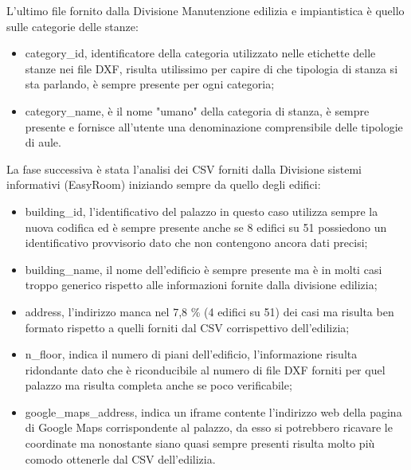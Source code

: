 \documentclass[12pt]{report}
\begin{document}
\vspace{5mm} %

L'ultimo file fornito dalla Divisione Manutenzione edilizia e impiantistica è quello sulle categorie delle stanze:
\begin{itemize}
\item category\_id, identificatore della categoria utilizzato nelle etichette delle stanze nei file DXF, risulta utilissimo per capire di che tipologia di stanza si sta parlando, è sempre presente per ogni categoria;
\item category\_name, è il nome "umano"  della categoria di stanza, è sempre presente e fornisce all'utente una denominazione comprensibile delle tipologie di aule.
\end{itemize} 

\vspace{5mm} %

La fase successiva è stata l'analisi dei CSV forniti dalla Divisione sistemi informativi (EasyRoom) iniziando sempre da quello degli edifici:
\begin{itemize}
\item building\_id, l'identificativo del palazzo in questo caso utilizza sempre la nuova codifica ed è sempre presente anche se 8 edifici su 51 possiedono un identificativo provvisorio dato che non contengono ancora dati precisi;
\item building\_name, il nome dell'edificio è sempre presente ma è in molti casi troppo generico rispetto alle informazioni fornite dalla divisione edilizia;
\item address, l'indirizzo manca nel 7,8 \% (4 edifici su 51) dei casi ma risulta ben formato rispetto a quelli forniti dal CSV corrispettivo dell'edilizia;
\item n\_floor, indica il numero di piani dell'edificio, l'informazione risulta ridondante dato che è riconducibile al numero di file DXF forniti per quel palazzo ma risulta completa anche se poco verificabile;
\item google\_maps\_address, indica un iframe contente l'indirizzo web della pagina di Google Maps corrispondente al palazzo, da esso si potrebbero ricavare le coordinate ma nonostante siano quasi sempre presenti risulta molto più comodo ottenerle dal CSV dell'edilizia. 
\end{itemize} 

\vspace{5mm} %
\end{document}
